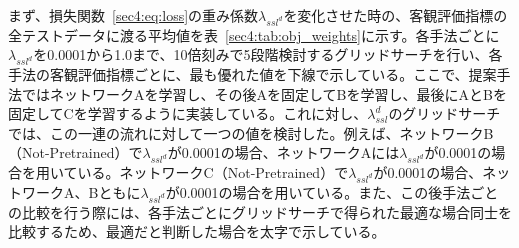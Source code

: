 \documentclass[12pt]{jarticle}
\numberwithin{equation}{section}    %
\numberwithin{figure}{section}      %
\numberwithin{table}{section}      %
\begin{document}
まず、損失関数~\eqref{sec4:eq:loss}の重み係数$\lambda_{ssl^{d}}$を変化させた時の、客観評価指標の全テストデータに渡る平均値を表~\ref{sec4:tab:obj_weights}に示す。各手法ごとに$\lambda_{ssl^{d}}$を0.0001から1.0まで、10倍刻みで5段階検討するグリッドサーチを行い、各手法の客観評価指標ごとに、最も優れた値を下線で示している。ここで、提案手法ではネットワークAを学習し、その後Aを固定してBを学習し、最後にAとBを固定してCを学習するように実装している。これに対し、$\lambda_{ssl}^{d}$のグリッドサーチでは、この一連の流れに対して一つの値を検討した。例えば、ネットワークB（Not-Pretrained）で$\lambda_{ssl^{d}}$が0.0001の場合、ネットワークAには$\lambda_{ssl^{d}}$が0.0001の場合を用いている。ネットワークC（Not-Pretrained）で$\lambda_{ssl^{d}}$が0.0001の場合、ネットワークA、Bともに$\lambda_{ssl^{d}}$が0.0001の場合を用いている。また、この後手法ごとの比較を行う際には、各手法ごとにグリッドサーチで得られた最適な場合同士を比較するため、最適だと判断した場合を太字で示している。
\end{document}
